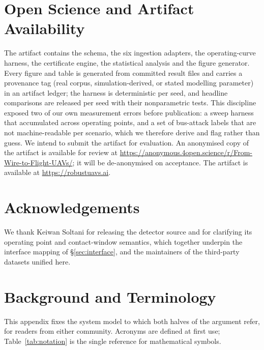 \section{Open Science and Artifact Availability}
\label{sec:openscience}
The artifact contains the schema, the six ingestion adapters, the
operating-curve harness, the certificate engine, the statistical analysis and
the figure generator. Every figure and table is generated from committed result
files and carries a provenance tag (real corpus, simulation-derived, or stated
modelling parameter) in an artifact ledger; the harness is deterministic per
seed, and headline comparisons are released per seed with their nonparametric
tests. This
discipline exposed two of our own measurement errors before publication: a
sweep harness that accumulated across operating points, and a set of bus-attack
labels that are not machine-readable per scenario, which we therefore derive
and flag rather than guess. We intend to submit the artifact for evaluation.
\ifanon
An anonymised copy of the artifact is available for review at
\url{https://anonymous.4open.science/r/From-Wire-to-Flight-UAVs/}; it will be
de-anonymised on acceptance.
\else
The artifact is available at \url{https://robustuavs.ai}.
\fi

\ifanon\else

\section*{Acknowledgements}
We thank Keiwan Soltani for releasing the  detector source and
for clarifying its operating point and contact-window semantics, which together
underpin the interface mapping of \S\ref{sec:interface}, and the maintainers of
the third-party datasets unified here.
\fi




\appendix

\section{Background and Terminology}
\label{sec:background}
This appendix fixes the system model to which both halves of the argument
refer, for readers from either community. Acronyms are defined at first use;
Table~\ref{tab:notation} is the single reference for mathematical symbols.

